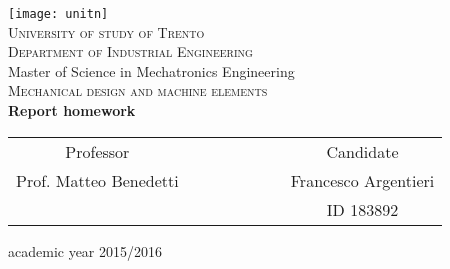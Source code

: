 \begin{titlepage}
 \begin{center}
 \texttt{[image: unitn]}\\
 \vspace{1.5em}
 {\Large \textsc{University of study of Trento}}\\
 \vspace{1.5em}
 {\Large \textsc{Department of Industrial Engineering}}\\
 \vspace{4em}
 {\normalsize Master of Science in Mechatronics Engineering}\\
 \vspace{1.5em}
 {\Large \textsc{Mechanical design and machine elements}}\\
 \vspace{4em}
 {\LARGE\textbf{
 	Report homework
 }}\\
 \end{center}

\vskip 2.0cm
\vskip 2.0cm
 \begin{center}
 \begin{tabular}{c c c c c c c c}
 Professor & & & & & & & Candidate \\[0.2cm]
 \large{Prof. Matteo Benedetti} & & & & & & & \large{Francesco Argentieri}\\[0.4cm]
  & & & & & & & ID 183892\\[0.2cm]
 \end{tabular}
 \end{center}

\vskip 1.5cm
\begin{center}
{\normalsize academic year 2015/2016}
\end{center}
\end{titlepage}

\clearpage{\pagestyle{empty}\cleardoublepage}
